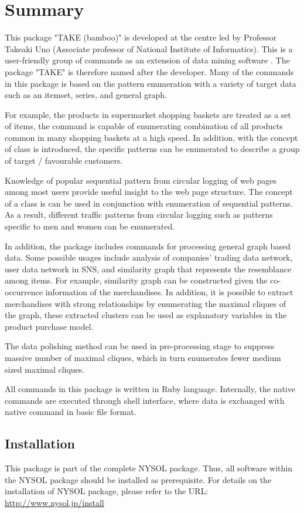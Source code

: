 

\section{Summary}
This package "TAKE (bamboo)" is developed at the centre led by Professor Takeaki Uno (Associate professor of National Institute of Informatics). This is a user-friendly group of commands as an extension of data mining software \cite{UnoWeb}. The package "TAKE" is therefore named after the developer.
Many of the commands in this package is based on the pattern enumeration with a variety of target data such as an itemset, series, and general graph. 

For example, the products in supermarket shopping baskets are treated as a set of items, the command is capable of enumerating combination of all products common in many shopping baskets at a high speed. In addition, with the concept of class is introduced, the specific patterns can be enumerated to describe a group of target / favourable customers. 

Knowledge of popular sequential pattern from circular logging of web pages among most users provide useful insight to the web page structure. The concept of a class is can be used in conjunction with enumeration of sequential patterns. As a result, different traffic patterns from circular logging such as patterns specific to men and women can be enumerated. 

In addition, the package includes commands for processing general graph based data. 
Some possible usages include analysis of companies' trading data network, user data network in SNS, and similarity graph that represents the resemblance among items. For example, similarity graph can be constructed given the co-occurrence information of the merchandises.  In addition, it is possible to extract merchandises with strong relationships by enumerating the maximal cliques of the graph, these extracted clusters can be used as explanatory variables in the product purchase model.

The data polishing method can be used in pre-processing stage to suppress massive number of maximal cliques, which in turn enumerates fewer medium sized maximal cliques. 

All  commands in this package  is written in Ruby language. Internally, the native commands are executed through shell interface, where data is exchanged with native command in basic file format.

\subsection{Installation}
This package is part of the complete NYSOL package. 
Thus, all software within the NYSOL package should be installed as prerequisite. 
For details on the installation of NYSOL package, please refer to the URL: \url{http://www.nysol.jp/install}


